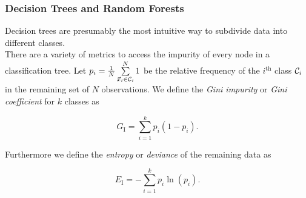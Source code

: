 
\subsubsection{Decision Trees and Random Forests}

Decision trees \citep{breiman1984} are presumably the most intuitive way to subdivide data into different classes.\\

There are a variety of metrics to access the impurity of every node in a classification tree. Let $p_i = \frac{1}{N} \sum\limits_{\vec x_i \in \mathcal{C}_i}^N 1$ be the relative frequency of the $i^{\text{th}}$ class $\mathcal{C}_i$ in the remaining set of $N$ observations. We define the \emph{Gini impurity} or \emph{Gini coefficient} for $k$ classes as

\begin{equation}
\label{eq:gini-impurity}
G_{\text{I}} = \sum\limits_{i=1}^k p_i (1 - p_i).
\end{equation}

Furthermore we define the \emph{entropy} or \emph{deviance} of the remaining data as

\begin{equation}
\label{eq:entropy-impurity}
E_{\text{I}} = - \sum\limits_{i=1}^k p_i \ln(p_i).
\end{equation}






